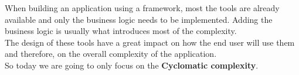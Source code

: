 \begin{frame}
When building an application using a framework, most the tools are already
available and only the business logic needs to be implemented. Adding the
business logic is usually what introduces most of the complexity.
\\
\pause
\vspace{\baselineskip}
The design of these tools have a great impact on how the end user will use them
and therefore, on the overall complexity of the application.
\\
\pause
\vspace{\baselineskip}
So today we are going to only focus on the \textbf{Cyclomatic complexity}.
\end{frame}
